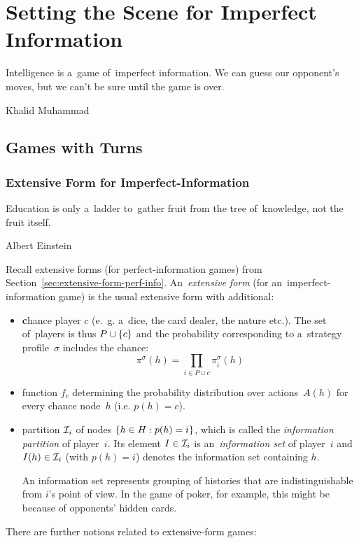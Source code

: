 \chapter{Setting the Scene for Imperfect Information}
\epigraph{
  Intelligence is a~game of~imperfect information.
  We can guess our opponent's moves, but we can't be sure until the game is over.
}{Khalid Muhammad}

\section{Games with Turns}

\subsection{Extensive Form for Imperfect-Information}
\label{ssec:extensive-form-imperf-info}
\epigraph{
  Education is only a~ladder to~gather fruit from the tree of~knowledge, not the fruit itself.
}{Albert Einstein}
Recall extensive forms (for perfect-information games) from Section~\ref{sec:extensive-form-perf-info}.
An~\emph{extensive form} (for an~imperfect-information game) is the usual extensive form with additional:
\begin{itemize}
  \item \textbf{c}hance player $c$ (e.~g. a~dice, the card dealer, the nature etc.).
    The set of~players is thus $P \cup \left\{ c \right\}$ and the probability corresponding to a~strategy profile~$\sigma$ includes the chance:
    \[\pi ^\sigma(h) = \prod _{i \in P \cup {c}} \pi _i ^\sigma (h)\]

  \item function $f_c$ determining the probability distribution over actions~$A(h)$ for every chance node~$h$ (i.e. $p(h) = c$).

  \item partition $\mathcal{I}_i$ of nodes $\left\{ h \in H: p(h) = i \right\}$, which is called the \emph{information partition} of player~$i$.
    Its element $I \in \mathcal{I}_i$ is an~\emph{information set} of player~$i$ and $I(h) \in \mathcal{I}_i$ (with $p(h) = i$) denotes the information set containing $h$.

    An information set represents grouping of histories that are indistinguishable from $i$'s point of view.
    In the game of poker, for example, this might be because of  opponents' hidden cards.
\end{itemize}
\noindent
There are further notions related to extensive-form games:
